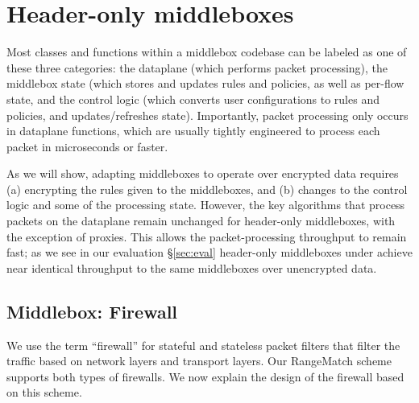 \section{Header-only middleboxes}
\label{sec:homiddleboxes}
Most classes and functions within a middlebox codebase can be labeled as one of these three categories: the dataplane (which performs packet processing), the middlebox state (which stores and updates rules and policies, as well as per-flow state, and the control logic (which converts user configurations to rules and policies, and updates/refreshes state). 
Importantly, packet processing only occurs in dataplane functions, which are usually tightly engineered to process each packet in microseconds or faster.

As we will show, adapting middleboxes to operate over encrypted data requires (a) encrypting the rules given to the middleboxes, and (b) changes to the control logic and some of the processing state. 
However, the key algorithms that process packets on the dataplane remain unchanged for header-only middleboxes, with the exception of proxies.
This allows the packet-processing throughput to remain fast; as we see in our evaluation \S\ref{sec:eval} header-only middleboxes under \sys achieve near identical throughput to the same middleboxes over unencrypted data. 

\subsection{Middlebox: Firewall}\label{sec:firewall}

We use the term ``firewall'' for stateful and stateless packet filters that filter the traffic based on network layers and transport layers.
Our RangeMatch scheme supports both types of firewalls. We now explain the design of the firewall based on this scheme.

